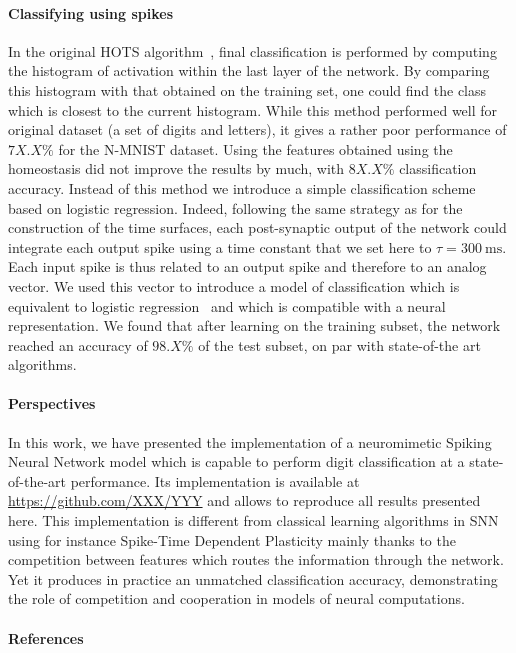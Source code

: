 \documentclass[12pt]{article}
\newcommand{\citep}[1]{\parencite{#1}}
\newcommand{\citet}[1]{\textcite{#1}}
\newcommand{\ms}{\si{\milli\second}}%
\begin{document}
\paragraph*{Classifying using spikes}
In the original HOTS algorithm~\citet{Lagorce17}, final classification is performed by computing the histogram of activation within the last layer of the network. By comparing this histogram with that obtained on the training set, one could find the class which is closest to the current histogram. While this method performed well for original dataset (a set of digits and letters), it gives a rather poor performance of $7X.X\%$ for the N-MNIST dataset. Using the features obtained using the homeostasis did not improve the results by much, with $8X.X\%$ classification accuracy. 
Instead of this method we introduce a simple classification scheme based on logistic regression. Indeed, following the same strategy as for the construction of the time surfaces, each post-synaptic output of the network could integrate each output spike using a time constant that we set here to $\tau=300~\ms$. Each input spike is thus related to an output spike and therefore to an analog vector. We used this vector to introduce a model of classification which is equivalent to logistic regression~\citep{Berens12} and which is compatible with a neural representation. We found that after learning on the training subset, the network reached an accuracy of $98.X\%$ of the test subset, on par with state-of-the art algorithms.
%
\paragraph*{Perspectives}
In this work, we have presented the implementation of a neuromimetic Spiking Neural Network model which is capable to perform digit classification at a state-of-the-art performance. Its implementation is available at \url{https://github.com/XXX/YYY} and allows to reproduce all results presented here. %
This implementation is different from classical learning algorithms in SNN using for instance Spike-Time Dependent Plasticity mainly thanks to the competition between features which routes the information through the network. Yet it produces in practice an unmatched classification accuracy, demonstrating the role of competition and cooperation in models of neural computations.
%
\paragraph*{References}
{
\small
\begingroup
{}
\setlength\bibitemsep{1pt}
\printbibliography[heading=none]
\endgroup
}


\end{document}
